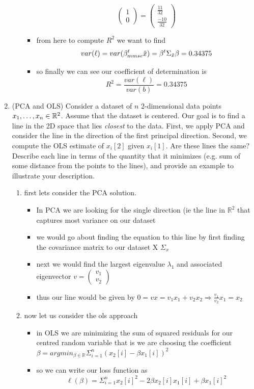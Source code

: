 \documentclass[12pt,twoside]{article}
\begin{document}
\begin{enumerate}
\begin{enumerate}
\begin{itemize}
$$\begin{pmatrix}
        1\\0
    \end{pmatrix}=\begin{pmatrix}
        \frac{11}{32}\\ \frac{-10}{32}
    \end{pmatrix}$$
    \item from here to compute $R^2$ we want to find $$var(\ell)=var(\beta_{mmse}^t\Tilde{x})=\beta^t \Sigma_{\Tilde{x}}\beta=0.34375$$
    \item so finally we can see our coefficient of determination is $$R^2=\frac{var(\ell)}{var(b)}=0.34375$$
\end{itemize}
\end{enumerate}
\newpage
\item (PCA and OLS) Consider a dataset of $n$ 2-dimensional data points $x_1,\ldots,x_n \in \mathbb{R}^2$. Assume that the dataset is centered. Our goal is to find a line in the 2D space that lies \emph{closest} to the data. First, we apply PCA and consider the line in the direction of the first principal direction. Second, we compute the OLS estimate of $x_i[2]$ given $x_i[1]$. Are these lines the same? Describe each line in terms of the quantity that it minimizes (e.g. sum of some distance from the points to the lines), and provide an example to illustrate your description.
\begin{enumerate}
    \color{blue}
    \item first lets consider the PCA solution.
    \begin{itemize}
        \item In PCA we are looking for the single direction (ie the line in $\mathbb{R}^2$ that captures most variance on our dataset 
        \item we would go about finding the equation to this line by first finding the covariance matrix to our dataset X $\Sigma_{x}$
        \item next we would find the largest eigenvalue $\lambda_1$ and associated eigenvector $v=\begin{pmatrix}v_1 \\ v_2\end{pmatrix}$
        \item thus our line would be given by $0=vx=v_1x_1+v_2x_2\Rightarrow \frac{v_1}{v_2}x_1=x_2$ 
    \end{itemize}
    \item now let us consider the ols approach 
    \begin{itemize}
        \item in OLS we are minimizing the sum of squared residuals for our centred random variable that is we are choosing the coefficient $\beta=argmin_{\beta\in \mathbb{R}}\Sigma_{i=1}^{n}(x_2[i]-\beta x_1[i])^2$ \item so we can write our loss function as $$\ell(\beta)=\Sigma_{i=1}^{n}x_2[i]^2-2\beta x_{2}[i]x_1[i]+\beta x_{1}[i]^2$$

\end{itemize}
\end{enumerate}
\end{enumerate}
\end{document}
